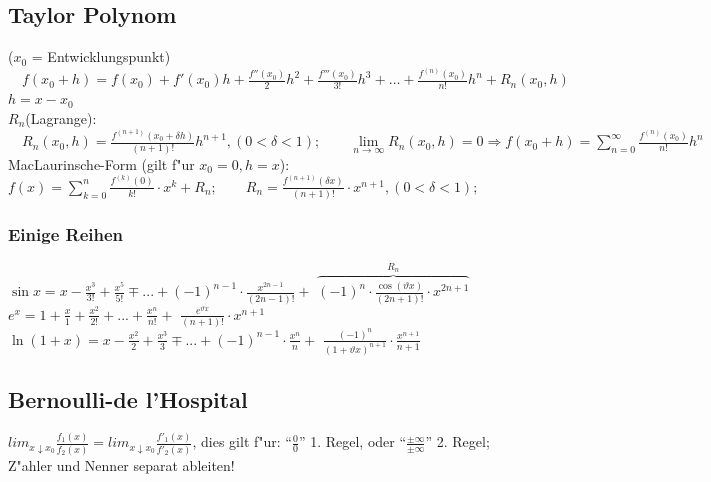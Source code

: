 \subsection{Taylor Polynom}
	($x_0$ = Entwicklungspunkt)$\quad f(x_0+h)=f(x_0) + f'(x_0)h + \frac{f''(x_0)}{2}h^2 + \frac{f'''(x_0)}{3!}h^3 + \ldots + \frac{f^{(n)}(x_0)}{n!}h^n + R_n(x_0, h)$\\
	$ h = x-x_0$\\
	$R_n$(Lagrange):$\quad R_n(x_0, h) = \frac{f^{(n+1)}(x_0 + \delta h)}{(n+1)!}h^{n+1}, (0 < \delta < 1);
	\qquad 
	\lim\limits_{n \to \infty} R_n(x_0, h) = 0 \Longrightarrow f(x_0+h) = \sum\limits_{n=0}^{\infty} \frac{f^{(n)}(x_0)}{n!}h^n$\\	
	\flushleft MacLaurinsche-Form (gilt f"ur $x_0=0, h=x $): $ f(x)=\sum\limits_{k=0}^{n} \frac{f^{(k)}(0)}{k!} \cdot x^k + R_n; 
	\qquad 
	R_n = \frac{f^{(n+1)}(\delta x)}{(n+1)!} \cdot x^{n+1}, (0 < \delta < 1);$
	
\subsubsection{Einige Reihen}
		$\sin x = x - \frac{x^3}{3!} +  \frac{x^5}{5!} \mp ... + (-1)^{n-1} \cdot \frac{x^{2n-1}}{(2n-1)!} + $
		$ \overbrace{(-1)^n \cdot \frac{\cos(\vartheta x)}{(2n+1)!} \cdot x^{2n+1}}^{R_n} $\\
		$e^x =  1 + \frac{x}{1} + \frac{x^2}{2!} + ... + \frac{x^n}{n!} + $
		$ \frac{e^{\vartheta x}}{(n+1)!} \cdot x^{n+1} $\\
		$\ln (1+x) = x - \frac{x^2}{2} + \frac{x^3}{3} \mp ... + (-1)^{n-1} \cdot \frac{x^n}{n} + $
		$ \frac{(-1)^n}{(1+\vartheta x)^{n+1}} \cdot \frac{x^{n+1}}{n+1} $ 

\subsection{Bernoulli-de l'Hospital}
	${lim} _{x\downarrow x_{0}} \frac{f_{1}(x)}{f_{2}(x)} = {lim} _{x\downarrow x_{0}} \frac{f'_{1}(x)}{f'_{2}(x)} $, dies gilt f"ur: "`$\frac{0}{0}$"' 1. Regel, oder "`$\frac{\pm\infty}{\pm\infty}$"' 2. Regel;   Z"ahler und Nenner separat ableiten!

